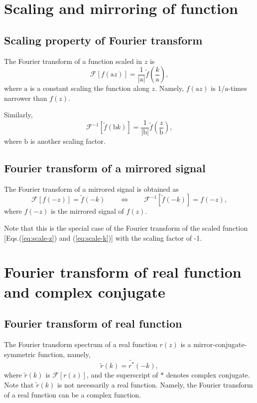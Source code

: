 \documentclass[a4paper]{article}
\newcommand{\ftf}[1]{{\mathcal{F}\left[#1\right]\xspace}}
\newcommand{\iftf}[1]{{\mathcal{F}^{-1}\left[#1\right]\xspace}}
\newcommand{\ftt}[1]{{\tilde{#1}\xspace}}
\newcommand{\cst}[1]{{\mathrm{#1}}\xspace}
\begin{document}
\section{Scaling and mirroring of function}
\subsection{Scaling property of Fourier transform}
The Fourier transform of a function scaled in $z$ is
\begin{equation}
	\label{eq:scale-z}
	\ftf{ f(\cst{a} z) } = \frac{1}{\left|\cst{a}\right|} \ftt{f}\left(\frac{k}{\cst{a}}\right),
\end{equation}
where $\cst{a}$ is a constant scaling the function along $z$.
Namely, $f(\cst{a}z)$ is $1/\cst{a}$-times narrower than $f(z)$. 

Similarly,
\begin{equation}
	\label{eq:scale-k}
	\iftf{ \ftt{f}(\cst{b} k) } = \frac{1}{\left|\cst{b}\right|} \ftt{f}\left(\frac{z}{\cst{b}}\right),
\end{equation}
where $\cst{b}$ is another scaling factor.

\subsection{Fourier transform of a mirrored signal}
The Fourier transform of a mirrored signal is obtained as
\begin{equation}
	\ftf{ f(-z) } = \ftt{f} (-k) 
	\qquad \Leftrightarrow \qquad
	\iftf{ \ftt{f}(-k) } = f(-z),
\end{equation}
where $f(-z)$ is the mirrored signal of $f(z)$.

Note that this is the special case of the Fourier transform of the scaled function [Eqs.\@ (\ref{eq:scale-z}) and (\ref{eq:scale-k})] with the scaling factor of -1.

\section{Fourier transform of real function and complex conjugate}
\subsection{Fourier transform of real function}
The Fourier transform spectrum of a real function $r(z)$ is a mirror-conjugate-symmetric function, namely,
\begin{equation}
	\ftt{r}(k) = \ftt{r^*}(-k),
\end{equation}
where $\ftt{r}(k)$ is $\ftf{r(z)}$, and the superscript of $*$ denotes complex conjugate.
Note that $\ftt{r}(k)$ is not necessarily a real function.
Namely, the Fourier transform of a real function can be a complex function.
\end{document}
